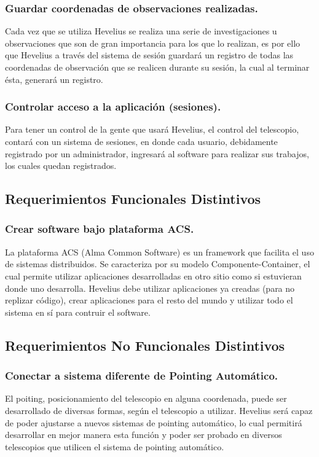 \documentclass[letterpaper,spanish,10pt]{article}
\begin{document}
\subsubsection{Guardar coordenadas de observaciones realizadas.}
Cada vez que se utiliza Hevelius se realiza una serie de investigaciones u observaciones que son de gran importancia para los que lo realizan, es por ello que Hevelius a través del sistema de sesión guardará un registro de todas las coordenadas de observación que se realicen durante su sesión, la cual al terminar ésta, generará un registro.

\subsubsection{Controlar acceso a la aplicaci\'on (sesiones).}
Para tener un control de la gente que usará Hevelius, el control del telescopio, contará con un sistema de sesiones, en donde cada usuario, debidamente registrado por un administrador, ingresará al software para realizar sus trabajos, los cuales quedan registrados.


\subsection{Requerimientos Funcionales Distintivos}
\subsubsection{Crear software bajo plataforma ACS.}
La plataforma ACS (Alma Common Software) es un framework que facilita el uso de sistemas distribuidos. Se caracteriza por su modelo Componente-Container, el cual permite utilizar aplicaciones desarrolladas en otro sitio como si estuvieran donde uno desarrolla. Hevelius debe utilizar aplicaciones ya creadas (para no replizar código), crear aplicaciones para el resto del mundo y utilizar todo el sistema en sí para contruir el software.


\subsection{Requerimientos No Funcionales Distintivos}
\subsubsection{Conectar a sistema diferente de Pointing Automático.}
El poiting, posicionamiento del telescopio en alguna coordenada, puede ser desarrollado de diversas formas, según el telescopio a utilizar. Hevelius será capaz de poder ajustarse a nuevos sistemas de pointing automático, lo cual permitirá desarrollar en mejor manera esta función y poder ser probado en diversos telescopios que utilicen el sistema de pointing automático.
\end{document}
